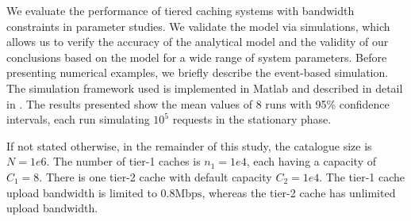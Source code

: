 We evaluate the performance of tiered caching systems with bandwidth constraints in parameter studies.
We validate the model via simulations, which allows us to verify the accuracy of the analytical model and the validity of our conclusions based on the model for a wide range of system parameters.
Before presenting numerical examples, we briefly describe the event-based simulation.
The simulation framework used is implemented in Matlab and described in detail in \cite{info3-inproceedings-2015-530}. The results presented show the mean values of 8 runs with 95\% confidence intervals, each run simulating $10^5$ requests in the stationary phase.

If not stated otherwise, in the remainder of this study, the catalogue size is $N=1e6$.
The number of tier-1 caches is $n_1=1e4$, each having a capacity of $C_1=8$.
There is one tier-2 cache with default capacity $C_2=1e4$.
The tier-1 cache upload bandwidth is limited to $0.8\text{Mbps}$, whereas the tier-2 cache has unlimited upload bandwidth.




%

